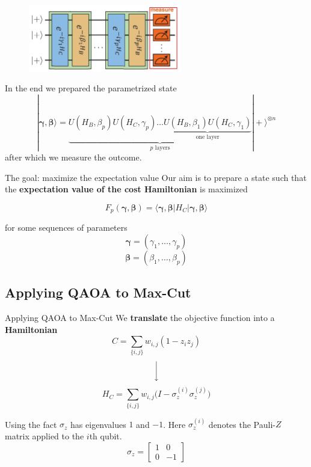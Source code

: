 \documentclass{beamer}
\renewcommand{\vec}[1]{\boldsymbol{#1}}
\newcommand{\gambe}{\vec{\gamma},\vec{\beta}}
\begin{document}
{\begin{frame}[t]
\begin{figure}[t]
	\includegraphics[width=0.6\textwidth]{figures/qaoa_idea_edit_4}
\end{figure}
\vspace{20px}
In the end we prepared the parametrized state
\begin{equation}
	|\gambe\rangle = \underbrace{U(H_B,\beta_p)U(H_C, \gamma_p)\dots \underbrace{U(H_B,\beta_1)U(H_C, \gamma_1)}_{\text{one layer}}}_{p \text{ layers}}|+\rangle^{\otimes n}
\end{equation}
after which we measure the outcome.
\end{frame}


\begin{frame}{The goal: maximize the expectation value}
	Our aim is to prepare a state such that the \textbf{expectation value of the cost Hamiltonian} is maximized
	
	\begin{equation}
		F_p(\gambe) = \langle \gambe | H_C | \gambe \rangle
	\end{equation}
	
	for some sequences of parameters 
	$$\vec{\gamma} = (\gamma_1,\dots,\gamma_p)$$
	$$\vec{\beta} = (\beta_1,\dots,\beta_p)$$
\end{frame}

\subsection{Applying QAOA to Max-Cut}
\begin{frame}{Applying QAOA to Max-Cut}
We \textbf{translate} the objective function into a \textbf{Hamiltonian}
\begin{equation}
C = \sum_{\{i,j\}} w_{i,j}(1 - z_iz_j)
\end{equation}
$$\bigg\downarrow$$
\begin{equation}
H_C = \sum_{\{i,j\}} w_{i,j}\big(I - \sigma_z^{(i)}\sigma_z^{(j)}\big)
\end{equation}

\pause
Using the fact $\sigma_z$ has eigenvalues $1$ and $-1$. Here $\sigma_z^{(i)}$ denotes the Pauli-$Z$ matrix applied to the $i$th qubit.
\begin{equation}
	\sigma_z = \begin{bmatrix}
	1 & 0 \\
	0 & -1
	\end{bmatrix}
\end{equation}
\end{frame}

}
\end{document}
